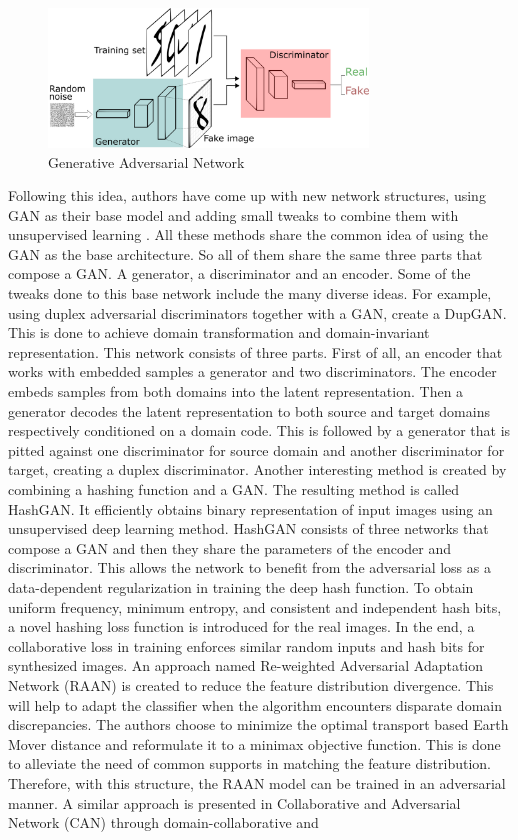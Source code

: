 \documentclass[letterpaper, 10 pt, conference]{ieeeconf}  %
\begin{document}
\begin{figure}[h!]
\centering
\includegraphics[width=8.5cm]{GANs.png}
\caption{Generative Adversarial Network}
\label{fig:GAN}
\end{figure}

Following this idea, authors have come up with new network structures, using GAN as their base model and adding small tweaks to combine them with unsupervised learning \cite{Hu_2018_CVPR} \cite{Dizaji_2018_CVPR} \cite{Chen_2018_CVPR} \cite{Zhang_collaborative_2018_CVPR}. All these methods share the common idea of using the GAN as the base architecture. So all of them share the same three parts that compose a GAN. A generator, a discriminator and an encoder. Some of the tweaks done to this base network include the many diverse ideas. For example, using duplex adversarial discriminators together with a GAN, create a DupGAN. This is done to achieve domain transformation and domain-invariant representation. This network consists of three parts. First of all, an encoder that works with embedded samples a generator and two discriminators. The encoder embeds samples from both domains into the latent representation. Then a generator decodes the latent representation to both source and target domains respectively conditioned on a domain code. This is followed by a generator that is pitted against one discriminator for source domain and another discriminator for target, creating a duplex discriminator. Another interesting method is created by combining a hashing function and a GAN. The resulting method is called HashGAN. It efficiently obtains binary representation of input images using an unsupervised deep learning method. HashGAN consists of three networks that compose a GAN and then they share the parameters of the encoder and discriminator. This allows the network to benefit from the adversarial loss as a data-dependent regularization in training the deep hash function. To obtain uniform frequency, minimum entropy, and consistent and independent hash bits, a novel hashing loss function is introduced for the real images. In the end, a collaborative loss in training enforces similar random inputs and hash bits for synthesized images. An approach named Re-weighted Adversarial Adaptation Network (RAAN) is created to reduce the feature distribution divergence. This will help  to adapt the classifier when the algorithm encounters disparate domain discrepancies. The authors choose to minimize the optimal transport based Earth Mover distance and reformulate it to a minimax objective function. This is done to alleviate the need of common supports in matching the feature distribution. Therefore, with this structure, the RAAN model can be trained in an adversarial manner. A similar approach is presented in Collaborative and Adversarial Network (CAN) through domain-collaborative and 
\end{document}
